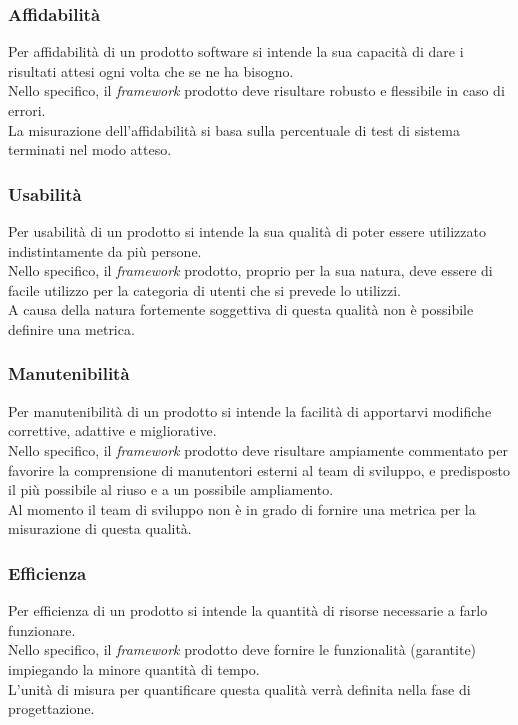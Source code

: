 		\subsubsection{Affidabilità}
			Per affidabilità di un prodotto software si intende la sua capacità di dare i risultati attesi ogni volta che se ne ha bisogno.\\
			Nello specifico, il \textit{framework} prodotto deve risultare robusto e flessibile in caso di errori.\\
			La misurazione dell'affidabilità si basa sulla percentuale di test di sistema terminati nel modo atteso.
		\subsubsection{Usabilità}
			Per usabilità di un prodotto si intende la sua qualità di poter essere utilizzato indistintamente da più persone.\\
			Nello specifico, il \textit{framework} prodotto, proprio per la sua natura, deve essere di facile utilizzo per la categoria di utenti che si prevede lo utilizzi.\\
			A causa della natura fortemente soggettiva di questa qualità non è possibile definire una metrica.
		\subsubsection{Manutenibilità}
			Per manutenibilità di un prodotto si intende la facilità di apportarvi modifiche correttive, adattive e migliorative.\\
			Nello specifico, il \textit{framework} prodotto deve risultare ampiamente commentato per favorire la comprensione di manutentori esterni al team di sviluppo, e predisposto il più possibile al riuso e a un possibile ampliamento.\\
			Al momento il team di sviluppo non è in grado di fornire una metrica per la misurazione di questa qualità.\\
		\subsubsection{Efficienza}
			Per efficienza di un prodotto si intende la quantità di risorse necessarie a farlo funzionare.\\
			Nello specifico, il \textit{framework} prodotto deve fornire le funzionalità (garantite) impiegando la minore quantità di tempo.\\
			L'unità di misura per quantificare questa qualità verrà definita nella fase di progettazione.
